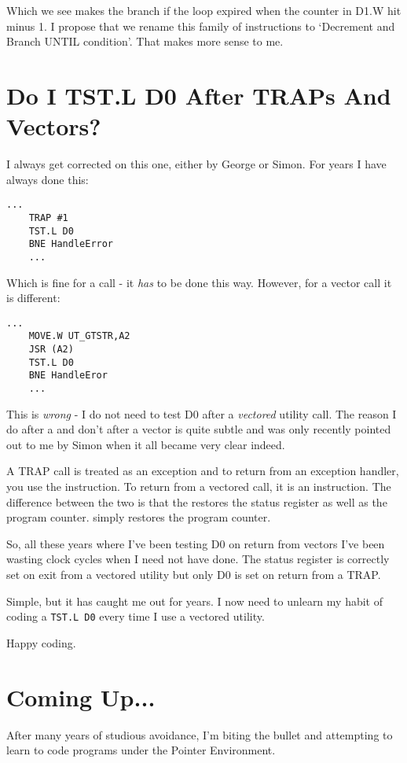 Which we see makes the branch if the loop expired when the counter in D1.W
        hit minus 1. I propose that we rename this family of instructions to `Decrement
        and Branch UNTIL condition'. That makes more sense to me.

\section{Do I TST.L D0 After TRAPs And Vectors?}
\label{ch19-trap-vector}%

I always get corrected on this one, either by George or Simon. For years I
        have always done this:

\begin{lstlisting}[firstnumber=1,]
    ...
    TRAP #1
    TST.L D0
    BNE HandleError
    ...
\end{lstlisting}

Which is fine for a  call -{} it \emph{has} to be done this
        way. However, for a vector call it is different:

\begin{lstlisting}[firstnumber=1,]
    ...
    MOVE.W UT_GTSTR,A2
    JSR (A2)
    TST.L D0
    BNE HandleEror
    ...
\end{lstlisting}

This is \emph{wrong} -{} I do not need to test D0 after a \emph{vectored} utility call. The
        reason I do after a  and don't after a vector is quite subtle and was only
        recently pointed out to me by Simon when it all became very clear indeed.

A TRAP call is treated as an exception and to return from an exception
        handler, you use the  instruction. To return from a vectored call, it is an 
        instruction. The difference between the two is that the  restores the status
        register as well as the program counter.  simply restores the program
        counter.

So, all these years where I've been testing D0 on return from vectors I've
        been wasting clock cycles when I need not have done. The status register is
        correctly set on exit from a vectored utility but only D0 is set on return
        from a TRAP.

Simple, but it has caught me out for years. I now need to unlearn my habit
	        of coding a \lstinline{TST.L D0} every time I use a vectored utility.

Happy coding.

\section{Coming Up...}
\label{ch19-the-end}%

After many years of studious avoidance, I'm biting the bullet and attempting
        to learn to code programs under the Pointer Environment.

